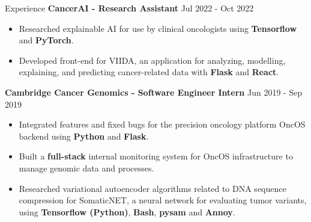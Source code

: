 \documentclass[hidelinks]{resume} %
\begin{document}
\begin{rSection}{Experience}
\textbf{CancerAI - Research Assistant}
\hfill {Jul 2022 - Oct 2022}
\begin{itemize}
    \item Researched explainable AI for use by clinical oncologists using \textbf{Tensorflow} and \textbf{PyTorch}.
    \item Developed front-end for VIIDA, an application for analyzing, modelling, explaining, and predicting cancer-related data with \textbf{Flask} and \textbf{React}.
\end{itemize}

\textbf{Cambridge Cancer Genomics - Software Engineer Intern}
\hfill {Jun 2019 - Sep 2019}
\begin{itemize}
    \item Integrated features and fixed bugs for the precision oncology platform OncOS backend using \textbf{Python} and \textbf{Flask}.
    \item Built a \textbf{full-stack} internal monitoring system for OncOS infrastructure to manage genomic data and processes.
    \item Researched variational autoencoder algorithms related to DNA sequence compression for SomaticNET, a neural network for evaluating tumor variants, using \textbf{Tensorflow (Python)}, \textbf{Bash}, \textbf{pysam} and \textbf{Annoy}.
\end{itemize}

\end{rSection} 
\end{document}
